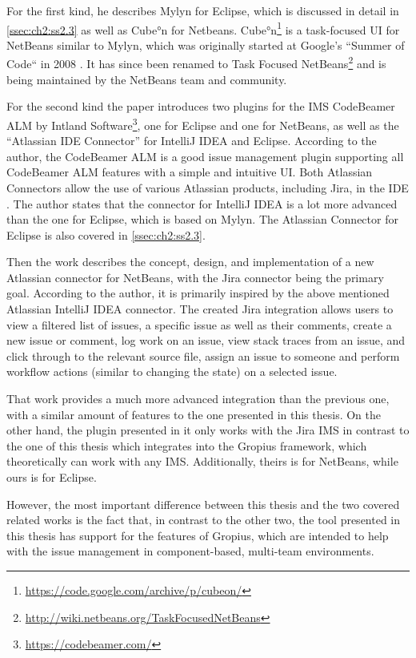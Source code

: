For the first kind, he describes Mylyn for \gls{Eclipse}, which is discussed in detail in \cref{ssec:ch2:ss2.3} as well as Cube°n for Netbeans.
Cube°n\footnote{\url{https://code.google.com/archive/p/cubeon/}} is a task-focused \gls{UI} for NetBeans similar to Mylyn, which was originally started at Google's ``Summer of Code`` in 2008 \cite{janak2009issue}.
It has since been renamed to Task Focused NetBeans\footnote{\url{http://wiki.netbeans.org/TaskFocusedNetBeans}} and is being maintained by the NetBeans team and community.

For the second kind the paper introduces two plugins for the \gls{IMS} CodeBeamer ALM by Intland Software\footnote{\url{https://codebeamer.com/}}, one for \gls{Eclipse} and one for NetBeans, as well as the ``Atlassian IDE Connector'' for IntelliJ IDEA and \gls{Eclipse}.
According to the author, the CodeBeamer ALM is a good issue management plugin supporting all CodeBeamer ALM features with a simple and intuitive \gls{UI}.
Both Atlassian Connectors allow the use of various Atlassian products, including Jira, in the \gls{IDE} \cite{janak2009issue}.
The author states that the connector for IntelliJ IDEA is a lot more advanced than the one for \gls{Eclipse}, which is based on Mylyn.
The Atlassian Connector for \gls{Eclipse} is also covered in \cref{ssec:ch2:ss2.3}.

Then the work describes the concept, design, and implementation of a new Atlassian connector for NetBeans, with the Jira connector being the primary goal.
According to the author, it is primarily inspired by the above mentioned Atlassian IntelliJ IDEA connector.
The created Jira integration allows users to view a filtered list of issues, a specific issue as well as their comments, create a new issue or comment, log work on an issue, view stack traces from an issue, and click through to the relevant source file, assign an issue to someone and perform workflow actions (similar to changing the state) on a selected issue.

That work provides a much more advanced integration than the previous one, with a similar amount of features to the one presented in this thesis.
On the other hand, the plugin presented in it only works with the Jira \gls{IMS} in contrast to the one of this thesis which integrates into the \gls{Gropius} framework, which theoretically can work with any \gls{IMS}.
Additionally, theirs is for NetBeans, while ours is for \gls{Eclipse}.

However, the most important difference between this thesis and the two covered related works
is the fact that, in contrast to the other two, the tool presented in this thesis has support for the features of \gls{Gropius},
which are intended to help with the issue management in component-based, multi-team environments.


